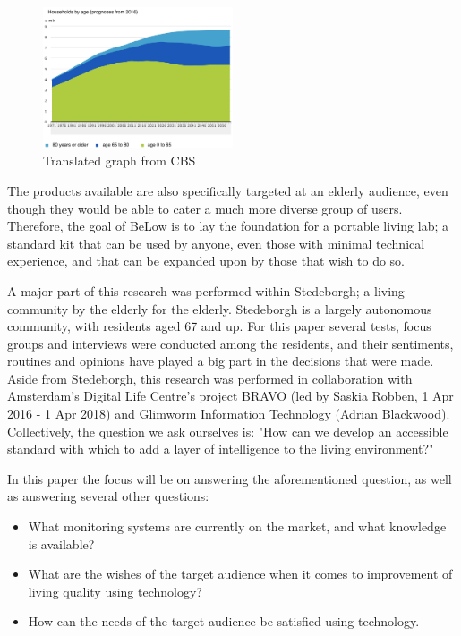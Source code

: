 \documentclass{below-ext}
\begin{document}
\begin{figure}
\center
\includegraphics[width=0.5\textwidth]{cbs_household_age_report}
\caption[Translated graph]{Translated graph from CBS\footnotemark }
\end{figure}
The products available are also specifically targeted at an elderly audience, even though they would be able to cater a much more diverse group of users. Therefore, the goal of BeLow is to lay the foundation for a portable living lab; a standard kit that can be used by anyone, even those with minimal technical experience, and that can be expanded upon by those that wish to do so.

A major part of this research was performed within Stedeborgh; a living community by the elderly for the elderly. Stedeborgh is a largely autonomous community, with residents aged 67 and up. For this paper several tests, focus groups and interviews were conducted among the residents, and their sentiments, routines and opinions have played a big part in the decisions that were made. Aside from Stedeborgh, this research was performed in collaboration with Amsterdam's Digital Life Centre's project BRAVO (led by Saskia Robben, 1 Apr 2016 - 1 Apr 2018) and Glimworm Information Technology (Adrian Blackwood). Collectively, the question we ask ourselves is: "How can we develop an accessible standard with which to add a layer of intelligence to the living environment?" 

In this paper the focus will be on answering the aforementioned question, as well as answering several other questions:
\begin{itemize}
\item What monitoring systems are currently on the market, and what knowledge is available?
\item  What are the wishes of the target audience when it comes to improvement of living quality using technology?
\item How can the needs of the target audience be satisfied using technology.
\end{itemize}
\end{document}
